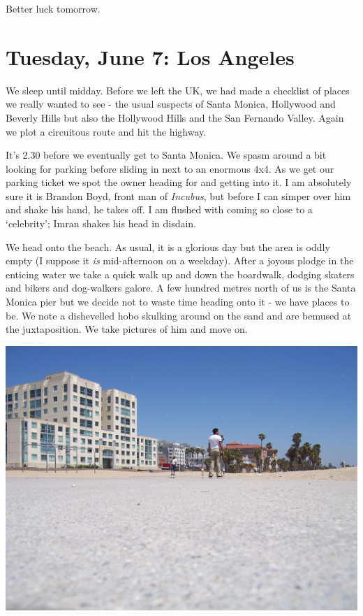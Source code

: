 \documentclass[a5paper,titlepage,11pt,draft]{book}
\begin{document}
Better luck tomorrow.

\chapter[Los Angeles]{Tuesday, June 7:  Los Angeles}
We sleep until midday.  Before we left the UK, we had made a checklist of places we really wanted to see - the usual suspects of Santa Monica, Hollywood and Beverly Hills but also the Hollywood Hills and the San Fernando Valley.  Again we plot a circuitous route and hit the highway.

It's 2.30 before we eventually get to Santa Monica.  We spasm around a bit looking for parking before sliding in next to an enormous 4x4.  As we get our parking ticket we spot the owner heading for and getting into it.  I am absolutely sure it is Brandon Boyd, front man of \emph{Incubus}, but before I can simper over him and shake his hand, he takes off.  I am flushed with coming so close to a `celebrity'; Imran shakes his head in disdain.

We head onto the beach.  As usual, it is a glorious day but the area is oddly empty (I suppose it \emph{is} mid-afternoon on a weekday).  After a joyous plodge in the enticing water we take a quick walk up and down the boardwalk, dodging skaters and bikers and dog-walkers galore.  A few hundred metres north of us is the Santa Monica pier but we decide not to waste time heading onto it - we have places to be.  We note a dishevelled hobo skulking around on the sand and are bemused at the juxtaposition.  We take pictures of him and move on.

\begin{center}\includegraphics[width=\textwidth]{gfx/100_1735}\end{center}
\end{document}
